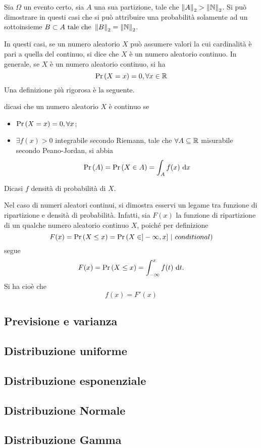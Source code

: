 \documentclass{subfiles}
\begin{document}
Sia \(\Omega\) un evento certo, sia \(A\) una sua partizione, tale che \(\Norm{A} > \Norm{\Natural}\).
Si può dimostrare in questi casi che si può attribuire una probabilità solamente ad un sottoinsieme \(B \subset A \text{tale che} \Norm{B} = \Norm{\Natural}\).

In questi casi, se un numero aleatorio \(X\) può assumere valori la cui cardinalità è pari a quella del continuo, si dice che \(X\) è un numero aleatorio continuo.
In generale, se \(X\) è un numero aleatorio continuo, si ha
\[
    \Prob{X = x} = 0, \forall x \in \Real
\]
Una definizione più rigorosa è la seguente.
\begin{Definition*}
    dicasi che un numero aleatorio \(X\) è continuo se
    \begin{itemize}
        \item \(\Prob{X = x} = 0, \forall x\);
        \item \(\exists f(x) > 0\) integrabile secondo Riemann, tale che \(\forall A \subseteq \operatorname{\mathbb{R}}\) misurabile secondo Peano-Jordan, si abbia
              \[
                  \Prob{A} = \Prob{X \in A} = \Int{f(x)}{x}[A]
              \]
    \end{itemize}
    \begin{Note*}
        Dicasi \(f\) densità di probabilità di \(X\).
    \end{Note*}
\end{Definition*}

Nel caso di numeri aleatori continui, si dimostra esservi un legame tra funzione di ripartizione e densità di probabilità.
Infatti, sia \(F(x)\) la funzione di ripartizione di un qualche numero aleatorio continuo \(X\), poiché per definizione
\[
    F(x) = \Prob{X \le x} = \Prob{X \in ]-\infty, x]}[conditional]
\]
segue
\[
    F(x) = \Prob{X \le x} = \Int{f(t)}{t}[-\infty][x].
\]
Si ha cioè che
\[
    f(x) = F'(x)
\]

\subsection{Previsione e varianza}

\clearpage

\subsection{Distribuzione uniforme}


\subsection{Distribuzione esponenziale}


\subsection{Distribuzione Normale}


\subsection{Distribuzione Gamma}

\end{document}

